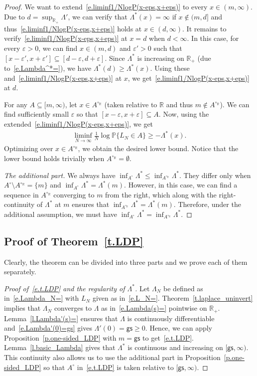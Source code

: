 \documentclass[11pt]{amsart}
\theoremstyle{remark}
\theoremstyle{definition}
\numberwithin{equation}{section}
\numberwithin{proposition}{section}
\numberwithin{figure}{section}
\numberwithin{table}{section}
\newcommand{\R}{\mathbb{R}}
\renewcommand{\P}{\mathbb{P}}
\newcommand{\eps}{\varepsilon}
\renewcommand{\leq}{\leqslant}
\renewcommand{\geq}{\geqslant}
\renewcommand{\subset}{\subseteq}
\newcommand{\1}{\mathbf{1}}
\newcommand{\msf}{\mathsf}
\newcommand{\gs}{\msf {gs}}
\begin{document}
\begin{proof}
We want to extend~\eqref{e.liminf1/NlogP(x-eps,x+eps)} to every $x \in (m,\infty)$. Due to $d = \sup_{\R_+}\Lambda'$, we can verify that $\Lambda^*(x)=\infty$ if $x\not\in (m,d]$ and thus~\eqref{e.liminf1/NlogP(x-eps,x+eps)} holds at $x\in(d,\infty)$. It remains to verify~\eqref{e.liminf1/NlogP(x-eps,x+eps)} at $x=d$ when $d<\infty$. 
In this case, for every $\eps>0$, we can find $x\in(m,d)$ and $\eps'>0$ such that $[x-\eps',x+\eps']\subset [d-\eps,d+\eps]$. Since $\Lambda^*$ is increasing on $\R_+$ (due to~\eqref{e.Lambda^*=}), we have $\Lambda^*(d) \geq \Lambda^*(x)$. Using these and~\eqref{e.liminf1/NlogP(x-eps,x+eps)} at $x$, we get~\eqref{e.liminf1/NlogP(x-eps,x+eps)} at $d$.

For any $A\subset [m,\infty)$, let $x\in A^{\circ_\R}$ (taken relative to $\R$ and thus $m\not\in A^{\circ_\R}$). We can find sufficiently small $\eps$ so that $[x-\eps,x+\eps]\subset A$. Now, using the extended~\eqref{e.liminf1/NlogP(x-eps,x+eps)}, we get
\begin{align*}
    \liminf_{N\to\infty} \frac{1}{N}\log \P\{L_N\in A\}\geq -\Lambda^*(x).
\end{align*}
Optimizing over $x\in A^{\circ_\R}$, we obtain the desired lower bound. Notice that the lower bound holds trivially when $A^{\circ_\R}=\emptyset$.

\textit{The additional part.}
We always have $\inf_{A^\circ}\Lambda^*\leq \inf_{A^{\circ_\R}}\Lambda^*$.
They differ only when $A^\circ\setminus A^{\circ_\R}=\{m\}$ and $\inf_{A^\circ}\Lambda^*= \Lambda^*(m)$. However, in this case, we can find a sequence in $A^{\circ_\R}$ converging to $m$ from the right, which along with the right-continuity of $\Lambda^*$ at $m$ ensures that $\inf_{A^{\circ_\R}}\Lambda^* = \Lambda^*(m)$. Therefore, under the additional assumption, we must have $\inf_{A^\circ}\Lambda^*=\inf_{A^{\circ_\R}}\Lambda^*$.
\end{proof}


\subsection{Proof of Theorem~\ref{t.LDP}}

Clearly, the theorem can be divided into three parts and we prove each of them separately.

\begin{proof}[Proof of~\eqref{e.t.LDP} and the regularity of $\Lambda^*$]
Let $\Lambda_N$ be defined as in~\eqref{e.Lambda_N=} with $L_N$ given as in~\eqref{e.L_N=}. Theorem~\ref{t.laplace_uninvert} implies that $\Lambda_N$ converges to $\Lambda$ as in~\eqref{e.Lambda(s)=} pointwise on $\R_+$. Lemma~\ref{l.Lambda'(s)=} ensures that $\Lambda$ is continuously differentiable and~\eqref{e.Lambda'(0)=gs} gives $\Lambda'(0)=\gs \geq0$. Hence, we can apply Proposition~\ref{p.one-sided_LDP} with $m=\gs$ to get~\eqref{e.t.LDP}. Lemma~\ref{l.basic_Lambda} gives that $\Lambda^*$ is continuous and increasing on $[\gs,\infty)$.
This continuity also allows us to use the additional part in Proposition~\ref{p.one-sided_LDP} so that $A^\circ$ in~\eqref{e.t.LDP} is taken relative to $[\gs,\infty)$.
\end{proof}
\end{document}
